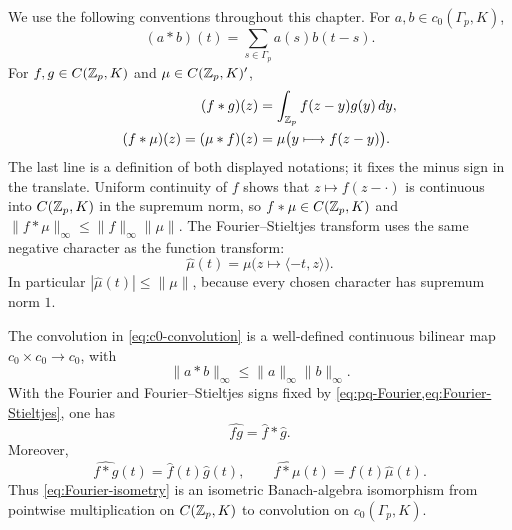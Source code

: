 We use the following conventions throughout this chapter.  For
$a,b\in c_0(\Gamma_p,K)$,
\begin{equation}
\label{eq:c0-convolution}
 (a*b)(t)=\sum_{s\in\Gamma_p}a(s)b(t-s).
\end{equation}
For $f,g\in C(\mathbb Z_p,K)$ and $\mu\in C(\mathbb Z_p,K)'$,
\begin{align}
 (f*g)(z)&=\int_{\mathbb Z_p}f(z-y)g(y)\,dy,
 \label{eq:function-convolution}\\
 (f*\mu)(z)=(\mu*f)(z)
 &=\mu\bigl(y\longmapsto f(z-y)\bigr).
 \label{eq:function-measure-convolution}
\end{align}
The last line is a definition of both displayed notations; it fixes the
minus sign in the translate.  Uniform continuity of $f$ shows that
$z\mapsto f(z-\cdot)$ is continuous into $C(\mathbb Z_p,K)$ in the supremum norm,
so $f*\mu\in C(\mathbb Z_p,K)$ and
$\|f*\mu\|_\infty\leq\|f\|_\infty\|\mu\|$.
The Fourier--Stieltjes transform uses the same negative character as the
function transform:
\begin{equation}
\label{eq:Fourier-Stieltjes}
 \widehat\mu(t)=\mu\bigl(z\longmapsto\langle-t,z\rangle\bigr).
\end{equation}
In particular $|\widehat\mu(t)|\leq\|\mu\|$, because every chosen character
has supremum norm $1$.

\begin{proposition}
\label{prop:typed-convolution-identities}
The convolution in \cref{eq:c0-convolution} is a well-defined continuous
bilinear map $c_0\times c_0\to c_0$, with
\begin{equation}
\label{eq:c0-convolution-bound}
 \|a*b\|_\infty\leq\|a\|_\infty\|b\|_\infty.
\end{equation}
With the Fourier and Fourier--Stieltjes signs fixed by
\cref{eq:pq-Fourier,eq:Fourier-Stieltjes}, one has
\begin{equation}
\label{eq:product-convolution}
 \widehat{fg}=\widehat f*\widehat g.
\end{equation}
Moreover,
\begin{equation}
\label{eq:function-convolution-Fourier}
 \widehat{f*g}(t)=\widehat f(t)\widehat g(t),
 \qquad
 \widehat{f*\mu}(t)=\widehat f(t)\widehat\mu(t).
\end{equation}
Thus \cref{eq:Fourier-isometry} is an isometric Banach-algebra isomorphism
from pointwise multiplication on $C(\mathbb Z_p,K)$ to convolution on
$c_0(\Gamma_p,K)$.
\end{proposition}

